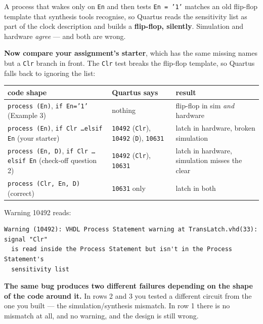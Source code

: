 \documentclass[11pt]{article}
\newcommand{\code}[1]{\texttt{#1}}
\begin{document}
A process that wakes only on \code{En} and then tests \code{En = '1'} matches an old
flip-flop template that synthesis tools recognise, so Quartus reads the sensitivity
list as part of the clock description and builds a \textbf{flip-flop, silently}.
Simulation and hardware \emph{agree} --- and both are wrong.

\textbf{Now compare your assignment's starter}, which has the same missing names but
a \code{Clr} branch in front. The \code{Clr} test breaks the flip-flop template, so
Quartus falls back to ignoring the list:

\begin{center}
\small
\begin{tabular}{>{\raggedright\arraybackslash}p{6.2cm}>{\raggedright\arraybackslash}p{4.6cm}>{\raggedright\arraybackslash}p{4.6cm}}
\toprule
code shape & Quartus says & result \\
\midrule
\code{process (En)}, \code{if En='1'} \newline (Example 3)
  & nothing
  & flip-flop in sim \emph{and} hardware \\
\code{process (En)}, \code{if Clr \ldots elsif En} \newline (your starter)
  & \code{10492} (\code{Clr}), \code{10492} (\code{D}), \code{10631}
  & latch in hardware, broken simulation \\
\code{process (En, D)}, \code{if Clr \ldots elsif En} \newline (check-off question 2)
  & \code{10492} (\code{Clr}), \code{10631}
  & latch in hardware, simulation misses the clear \\
\code{process (Clr, En, D)} \newline (correct)
  & \code{10631} only
  & latch in both \\
\bottomrule
\end{tabular}
\normalsize
\end{center}

Warning 10492 reads:
\begin{lstlisting}
Warning (10492): VHDL Process Statement warning at TransLatch.vhd(33): signal "Clr"
  is read inside the Process Statement but isn't in the Process Statement's
  sensitivity list
\end{lstlisting}

\textbf{The same bug produces two different failures depending on the shape of the
code around it.} In rows 2 and 3 you tested a different circuit from the one you
built --- the simulation/synthesis mismatch. In row 1 there is no mismatch at all,
and no warning, and the design is still wrong.
\end{document}
